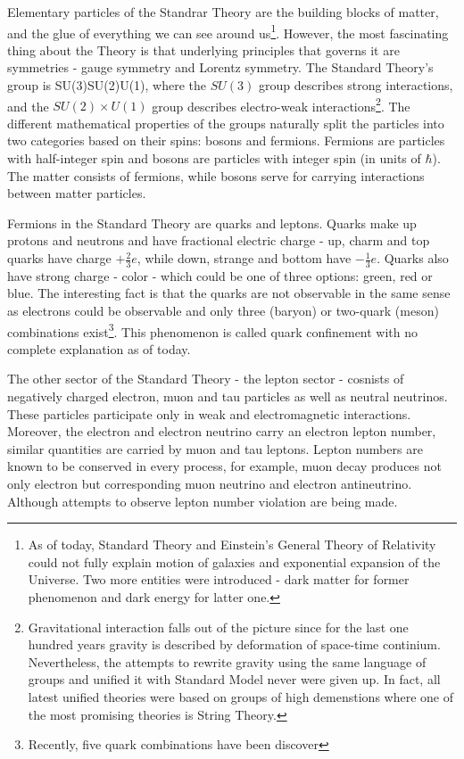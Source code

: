 Elementary particles of the Standrar Theory are the building blocks of matter, and the glue of everything we
can see around us\footnote{As of today, Standard Theory and Einstein's General Theory of 
Relativity could not fully explain motion of galaxies and exponential expansion of the Universe. 
Two more entities were introduced - dark matter for former phenomenon and dark energy 
for latter one.}. However, the most fascinating thing about the Theory is that underlying 
principles that governs it are symmetries - gauge symmetry and Lorentz 
symmetry. The Standard Theory's group is 
\be
SU(3)\times SU(2)\times U(1),
\ee 
where the $SU(3)$ group describes strong interactions, and the $SU(2)\times U(1)$ group describes 
electro-weak interactions\footnote{Gravitational interaction falls out of the picture
since for the last one hundred years gravity is described by deformation of space-time 
continium. Nevertheless, the attempts to rewrite gravity using the same language of groups
and unified it with Standard Model never were given up. In fact, all latest unified theories 
were based on groups of high demenstions where one of the most promising theories is 
String Theory.}. The different mathematical properties of the groups naturally split
the particles into two categories based on their spins: bosons and fermions. Fermions are 
particles with half-integer spin and bosons are particles with integer spin (in units of $\hbar$). 
The matter consists of fermions, while bosons serve for carrying interactions between matter particles.

Fermions in the Standard Theory are quarks and leptons. Quarks make up protons
and neutrons and have fractional electric charge - up, charm and top quarks have charge $+\frac{2}{3}e$, 
while down, strange and bottom have $-\frac{1}{3}e$. Quarks also have strong charge - color -
which could be one of three options: green, red or blue. The interesting fact is that the quarks
are not observable in the same sense as electrons could be observable and only three (baryon) or 
two-quark (meson) combinations exist\footnote{Recently, five quark combinations have been discover}. 
This phenomenon is called quark confinement with no complete explanation as of today. 

The other sector of the Standard Theory - the lepton sector - cosnists of negatively charged electron,
muon and tau particles as well as neutral neutrinos. These particles participate only in
weak and electromagnetic interactions. Moreover, the electron and electron neutrino carry an electron 
lepton number, similar quantities are carried by muon and tau leptons. Lepton numbers are known to be 
conserved in every process, for example, muon decay produces not only electron but corresponding muon 
neutrino and electron antineutrino. Although attempts to observe lepton number violation are being made.

